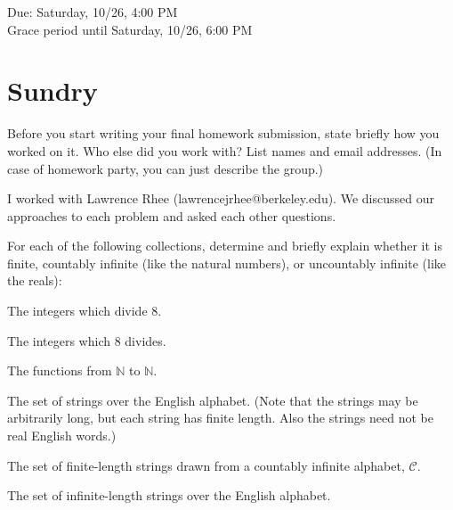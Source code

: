 \documentclass[11pt]{article}
\begin{document}
\maketitle
\fontsize{12}{15}\selectfont

\begin{center}
    Due: Saturday, 10/26, 4:00 PM \\
    Grace period until Saturday, 10/26, 6:00 PM \\
\end{center}

\section*{Sundry}
Before you start writing your final homework submission, state briefly how you worked on it.  Who else did you work with?  List names and email addresses.  (In case of homework party, you can just describe the group.)

  \begin{solution}
    I worked with Lawrence Rhee (lawrencejrhee@berkeley.edu). 
    We discussed our approaches to each problem and asked each other questions.  
  \end{solution}
\vspace{15pt}


For each of the following collections, determine and briefly explain whether it is finite, countably infinite (like the natural numbers), or uncountably infinite (like the reals):

\begin{Parts}





\Part The integers which divide $8$.


\Part The integers which $8$ divides.


\Part The functions from $\mathbb{N}$ to $\mathbb{N}$.


\Part The set of strings over the English alphabet. (Note that the strings may be arbitrarily long, but each string has finite length. Also the strings need not be real English words.)





\Part The set of finite-length strings drawn from a countably infinite alphabet, $\mathcal{C}$.

\Part The set of infinite-length strings over the English alphabet.

\end{Parts}
\end{document}
